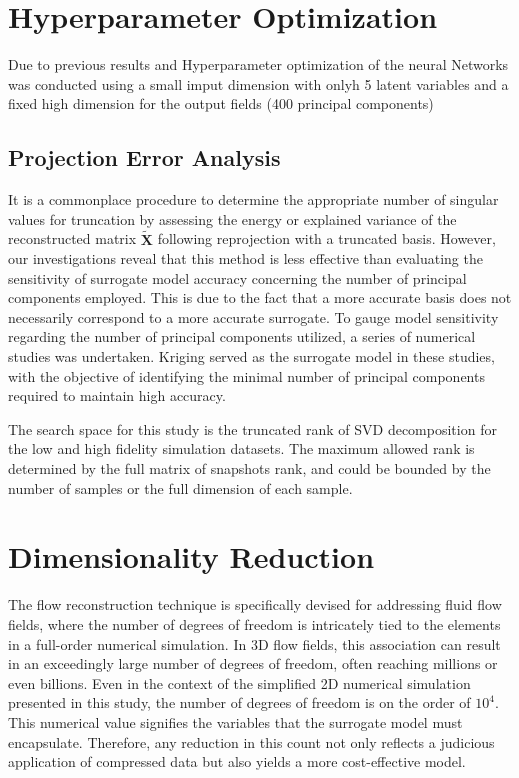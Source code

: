 \section{Hyperparameter Optimization}

Due to previous results and Hyperparameter optimization of the neural Networks was conducted using a small imput dimension with onlyh 5 latent variables and a fixed high dimension for the output fields (400 principal components)


\subsection{Projection Error Analysis}

It is a commonplace procedure to determine the appropriate number of singular values for truncation by assessing the energy or explained variance of the reconstructed matrix $\mathbf{\tilde{X}}$ following reprojection with a truncated basis. However, our investigations reveal that this method is less effective than evaluating the sensitivity of surrogate model accuracy concerning the number of principal components employed. This is due to the fact that a more accurate basis does not necessarily correspond to a more accurate surrogate. To gauge model sensitivity regarding the number of principal components utilized, a series of numerical studies was undertaken. Kriging served as the surrogate model in these studies, with the objective of identifying the minimal number of principal components required to maintain high accuracy.

The search space for this study is the truncated rank of SVD decomposition for the low and high fidelity simulation datasets. The maximum allowed rank is determined by the full matrix of snapshots rank, and could be bounded by the number of samples or the full dimension of each sample. 


\section{Dimensionality Reduction}

The flow reconstruction technique is specifically devised for addressing fluid flow fields, where the number of degrees of freedom is intricately tied to the elements in a full-order numerical simulation. In 3D flow fields, this association can result in an exceedingly large number of degrees of freedom, often reaching millions or even billions. Even in the context of the simplified 2D numerical simulation presented in this study, the number of degrees of freedom is on the order of $10^4$. This numerical value signifies the variables that the surrogate model must encapsulate. Therefore, any reduction in this count not only reflects a judicious application of compressed data but also yields a more cost-effective model.

